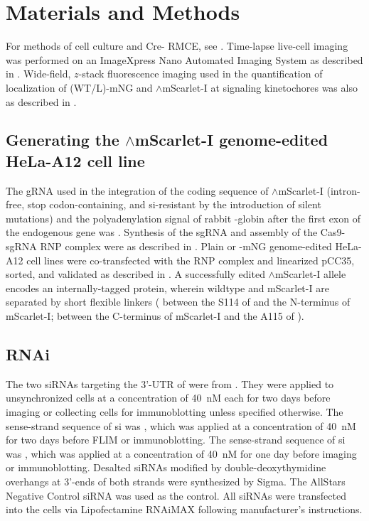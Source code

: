 \section{Materials and Methods}

For methods of cell culture and Cre- RMCE, see . Time-lapse live-cell imaging was performed on an ImageXpress Nano Automated Imaging System as described in . Wide-field, $z$-stack fluorescence imaging used in the quantification of localization of (WT/\textDelta{}L)-mNG and $\wedge$mScarlet-I at signaling kinetochores was also as described in .

\subsection{Generating the $\wedge$mScarlet-I genome-edited HeLa-A12 cell line}

The gRNA used in the integration of the coding sequence of $\wedge$mScarlet-I (intron-free, stop codon-containing, and si-resistant by the introduction of silent mutations) and the polyadenylation signal of rabbit \textbeta{}-globin after the first exon of the endogenous  gene was . Synthesis of the sgRNA and assembly of the Cas9-sgRNA RNP complex were as described in . Plain or -mNG genome-edited HeLa-A12 cell lines were co-transfected with the RNP complex and linearized pCC35, sorted, and validated as described in . A successfully edited $\wedge$mScarlet-I allele encodes an internally-tagged  protein, wherein wildtype  and mScarlet-I are separated by short flexible linkers ( between the S114 of  and the N-terminus of mScarlet-I;  between the C-terminus of mScarlet-I and the A115 of ).

\subsection{RNAi}

The two siRNAs targeting the 3'-UTR of  were from \cite{siMAD1-3UTR}. They were applied to unsynchronized cells at a concentration of \SI{40}{nM} each for two days before imaging or collecting cells for immunoblotting unless specified otherwise. The sense-strand sequence of si was  \cite{siCDC20}, which was applied at a concentration of \SI{40}{nM} for two days before FLIM or immunoblotting. The sense-strand sequence of si was  \cite{BubR1MitosisTurnover}, which was applied at a concentration of \SI{40}{nM} for one day before imaging or immunoblotting. Desalted siRNAs modified by double-deoxythymidine overhangs at 3'-ends of both strands were synthesized by Sigma. The AllStars Negative Control siRNA was used as the control. All siRNAs were transfected into the cells via Lipofectamine RNAiMAX following manufacturer’s instructions.

